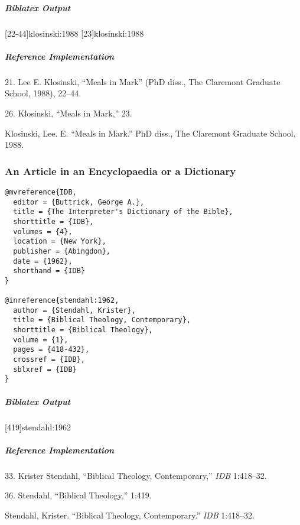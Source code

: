 \documentclass[a4paper]{article}
\newenvironment{biboutput}{%
  \subparagraph{Biblatex Output}
}{\color{black}}
\newenvironment{refimp}{%
  \subparagraph{Reference Implementation}
  \color{reference-colour}
  \rm
}{\par\color{black}}
\begin{document}
\begin{biboutput}
  [22-44]{klosinski:1988}
  [23]{klosinski:1988}
\end{biboutput}

\begin{refimp}
  21. Lee E. Klosinski, “Meals in Mark” (PhD diss., The Claremont Graduate
  School, 1988), 22–44.

  26. Klosinski, “Meals in Mark,” 23.

  \hangindent\bibindent Klosinski, Lee. E. “Meals in Mark.” PhD diss., The
  Claremont Graduate School, 1988.
\end{refimp}

\subsubsection{An Article in an Encyclopaedia or a Dictionary}

\begin{lstlisting}
@mvreference{IDB,
  editor = {Buttrick, George A.},
  title = {The Interpreter's Dictionary of the Bible},
  shorttitle = {IDB},
  volumes = {4},
  location = {New York},
  publisher = {Abingdon},
  date = {1962},
  shorthand = {IDB}
}

@inreference{stendahl:1962,
  author = {Stendahl, Krister},
  title = {Biblical Theology, Contemporary},
  shorttitle = {Biblical Theology},
  volume = {1},
  pages = {418-432},
  crossref = {IDB},
  sblxref = {IDB}
}
\end{lstlisting}  

\begin{biboutput}
  [419]{stendahl:1962}
  \toggletrue{fullbibrefs}
  \togglefalse{fullbibrefs}
\end{biboutput}

\begin{refimp}
  33. Krister Stendahl, “Biblical Theology, Contemporary,” \emph{IDB}
  1:418–32.
  
  36. Stendahl, “Biblical Theology,” 1:419.
  
  Stendahl, Krister. “Biblical Theology, Contemporary.” \emph{IDB} 1:418–32.

\end{refimp}
\end{document}
